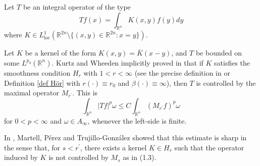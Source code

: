 \documentclass[a4paper,11pt,reqno]{amsart}
\theoremstyle{plain}
\numberwithin{equation}{section}
\theoremstyle{definition}
\newcommand{\R}{{\mathbb{R}^n}}
\begin{document}
Let $T$ be an integral operator of the type
\begin{equation}\label{T}
	Tf(x)=\int_{\R}K(x,y)f(y)dy
\end{equation}
where $K\in L^1_{\text{loc}}\left(\mathbb{R}^{2n} \setminus \{(x,y)\in\mathbb{R}^{2n} : x=y\}\right)$.

Let $K$ be a kernel of the form $K(x,y)=\bar{K}(x-y)$, and $T$ be bounded on some $L^{p_0}(\R)$. Kurtz and Wheeden implicitly proved in \cite{Hr} that if $K$ satisfies the smoothness condition $H_r$ with $1<r<\infty$ (see the precise definition in \cite{Hr es sharp} or Definition \ref{def Hör} with $r(\cdot)\equiv r_0$ and $\beta(\cdot)\equiv\infty$), then $T$ is controlled by the maximal operator $M_{r^\prime}$. This is
\begin{equation}
\int_{\R}|Tf|^p \omega\leq C\int_{\R}\left(M_{r^\prime}f\right)^p \omega
\end{equation}
for $0<p<\infty$ and $\omega\in A_\infty$, whenever the left-side is finite.
 
In \cite{Hr es sharp}, Martell, Pérez and Trujillo-González showed that this estimate is sharp in the sense that, for $s<r^\prime$, there exists a kernel $K\in H_r$ such that the operator induced by $K$ is not controlled by $M_s$ as in (1.3). 
\end{document}
